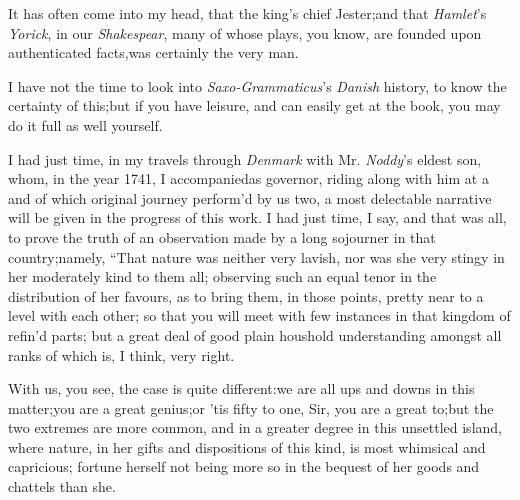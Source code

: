 \documentclass{article}
\begin{document}
It has often come into my head, that 
the king’s chief Jester;\tsk  and that
\textit{Hamlet}’s \textit{Yorick}, in our \textit{Shakespear},
many of whose plays, you know, are founded upon authenticated
facts,\tsk was certainly the very man.

I have not the time to look into \textit{Saxo-Grammaticus}’s
\textit{Danish} history, to know the certainty of this;\tsk  but if
you have leisure, and can easily get at the book, you may do
it full as well yourself.

I had just time, in my travels through \textit{Denmark} with Mr.\@
\textit{Noddy}’s eldest son, whom, in the year 1741, I
accompanied\pb as governor, riding along with him at a
and of which original journey
perform’d by us two, a most delectable narrative will be given in
the progress of this work.\break
I had just time, I say, and that was
all, to prove the truth of an observation made by a long sojourner
in that country;\tsh\break namely, “That nature was
neither very lavish, nor was she very stingy in her\break
{}
moderately kind to them all; observing such an equal tenor in
the distribution of her favours, as to bring them, in those points,
pretty near to a level with each other; so that you will meet with
few instances in that kingdom of refin’d parts; but a great
deal of good plain hous\-hold understanding amongst all
ranks of\pb{}
which is, I think, very right.

With us, you see, the case is quite different:\tsk  we are all
ups and downs in this matter;\tsk  you are a great
genius;\tsk\break  or ’tis fifty to one, Sir, you are a great
to;\tsk  but the two extremes are more common, and in a
greater degree in this unsettled island, where nature, in her gifts
and dispositions of this kind, is most whimsical and capricious;
fortune herself not being more so in the bequest of her goods and
chattels than she.
\end{document}
